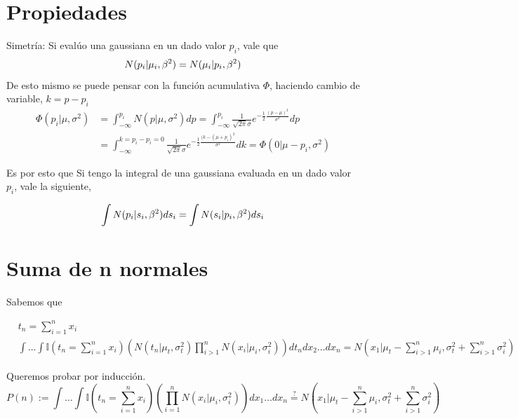 \documentclass[11pt,twoside,spanish]{report} %
\begin{document}
\section{Propiedades}

Simetr\'ia:  Si eval\'uo una gaussiana en un dado valor $p_i$, vale que
\begin{equation}
	\centering
	N(p_i \vert \mu_i,\beta^2) =  N(\mu_i \vert p_i,\beta^2)
\end{equation}
De esto mismo se puede pensar con la funci\'on acumulativa $\Phi$, haciendo cambio de variable, $k=p-p_i$
\begin{equation}
	\begin{split}
		\Phi(p_i \vert \mu,\sigma^2) &= \int_{-\infty}^{p_i} N(p \vert \mu,\sigma^2) dp = \int_{-\infty}^{p_i} \frac{1}{\sqrt{2\pi}\sigma}e^{-\frac{1}{2}\frac{(p-\mu)^2}{\sigma^2}} dp\\
		& = \int_{-\infty}^{k=p_i-p_i=0} \frac{1}{\sqrt{2\pi}\sigma}e^{-\frac{1}{2}\frac{(k-(\mu+p_i)^2}{\sigma^2}}dk= \Phi(0 \vert \mu-p_i,\sigma^2)
	\end{split}
\end{equation}

Es por esto que Si tengo la integral de una gaussiana evaluada en un dado valor $p_i$, vale la siguiente,

\begin{equation}
	\centering
	\int N(p_i \vert s_i,\beta^2) ds_i =  \int N(s_i \vert p_i,\beta^2)ds_i
\end{equation}

\section{Suma de n normales}\label{suma_normales_induccion}

Sabemos que

\begin{equation}
	\begin{split}
		&t_n = \sum_{i=1}^n x_i\\
		&\int \dots \int \mathbb{I}(t_n= \sum_{i=1}^n x_i ) \left( N(t_n|\mu_t,\sigma_t^2)\prod_{i>1}^n N(x_i|\mu_i,\sigma_i^2) \right) dt_ndx_2 \dots dx_n =  N\left(x_1|\mu_t-\sum_{i>1}^n \mu_i,\sigma_t^2+\sum_{i>1}^n\sigma_i^2\right)
	\end{split}
\end{equation}


Queremos probar por inducci\'on.
\begin{equation}
	P(n):= \int \dots \int \mathbb{I}(t_n= \sum_{i=1}^n x_i ) \left( \prod_{i=1}^n N(x_i|\mu_i,\sigma_i^2) \right) dx_1 \dots dx_n \overset{?}{=} N\left(x_1|\mu_t-\sum_{i>1}^n \mu_i,\sigma_t^2+\sum_{i>1}^n\sigma_i^2\right)
\end{equation}
\end{document}
